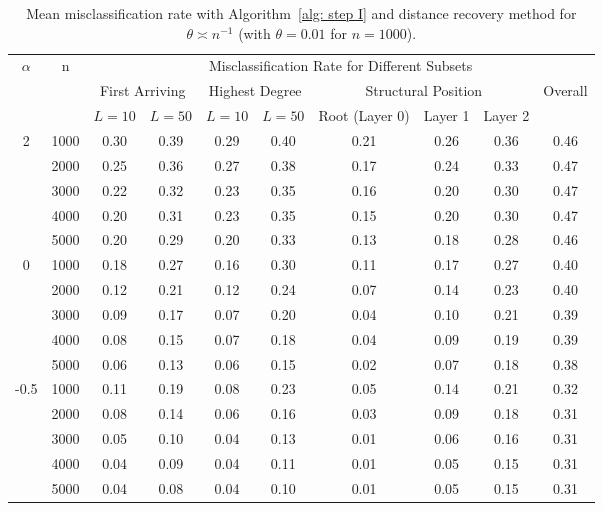 \begin{table}[tbp]
\setlength{\tabcolsep}{3.5pt}

\centering
\small

{
\begin{tabular}{c|c|cc|cc|ccc|c}
\hline
\hline
\multirow{3}{*}{$\alpha$} & \multirow{3}{*}{n}
& \multicolumn{8}{c}{Misclassification Rate for Different Subsets} \\
\cline{3-10}
& 
& \multicolumn{2}{c|}{First Arriving}
& \multicolumn{2}{c|}{Highest Degree}
& \multicolumn{3}{c|}{Structural Position}
& \multirow{2}{*}{Overall} \\
\cline{3-9}
& 
& $L=10$ & $L=50$
& $L=10$ & $L=50$
& Root (Layer 0) & Layer 1 & Layer 2
& \\
\hline
\multirow{5}{*}{2}
& 1000 & 0.30 & 0.39 & 0.29 & 0.40 & 0.21 & 0.26 & 0.36 & 0.46 \\
& 2000 & 0.25 & 0.36 & 0.27 & 0.38 & 0.17 & 0.24 & 0.33 & 0.47 \\
& 3000 & 0.22 & 0.32 & 0.23 & 0.35 & 0.16 & 0.20 & 0.30 & 0.47 \\
& 4000 & 0.20 & 0.31 & 0.23 & 0.35 & 0.15 & 0.20 & 0.30 & 0.47 \\
& 5000 & 0.20 & 0.29 & 0.20 & 0.33 & 0.13 & 0.18 & 0.28 & 0.46 \\
\hline
\multirow{5}{*}{0}
& 1000 & 0.18 & 0.27 & 0.16 & 0.30 & 0.11 & 0.17 & 0.27 & 0.40 \\
& 2000 & 0.12 & 0.21 & 0.12 & 0.24 & 0.07 & 0.14 & 0.23 & 0.40 \\
& 3000 & 0.09 & 0.17 & 0.07 & 0.20 & 0.04 & 0.10 & 0.21 & 0.39 \\
& 4000 & 0.08 & 0.15 & 0.07 & 0.18 & 0.04 & 0.09 & 0.19 & 0.39 \\
& 5000 & 0.06 & 0.13 & 0.06 & 0.15 & 0.02 & 0.07 & 0.18 & 0.38 \\
\hline
\multirow{5}{*}{-0.5}
& 1000 & 0.11 & 0.19 & 0.08 & 0.23 & 0.05 & 0.14 & 0.21 & 0.32 \\
& 2000 & 0.08 & 0.14 & 0.06 & 0.16 & 0.03 & 0.09 & 0.18 & 0.31 \\
& 3000 & 0.05 & 0.10 & 0.04 & 0.13 & 0.01 & 0.06 & 0.16 & 0.31 \\
& 4000 & 0.04 & 0.09 & 0.04 & 0.11 & 0.01 & 0.05 & 0.15 & 0.31 \\
& 5000 & 0.04 & 0.08 & 0.04 & 0.10 & 0.01 & 0.05 & 0.15 & 0.31 \\
\hline
\hline
\end{tabular}
}


\caption{Mean misclassification rate with Algorithm~\ref{alg: step I} and distance recovery method for $\theta \asymp n^{-1}$ (with $\theta=0.01$ for $n=1000$).}
\label{tab:mean_error_scale_n1}
\end{table}